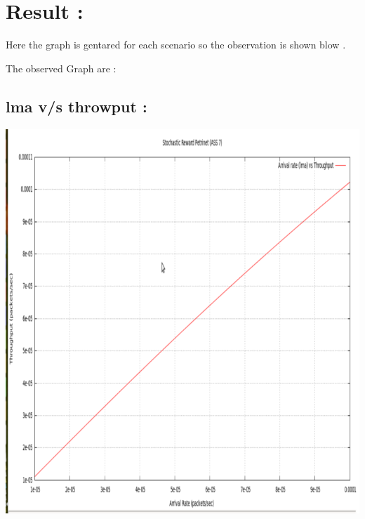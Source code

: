 \documentclass[a4paper,12pt]{article}
\begin{document}

\newpage

\section{Result :}
Here the graph is gentared for each scenario so the observation is shown blow .



The observed  Graph are :

\begin{center}
\subsection {lma v/s throwput :}
 \includegraphics[width=15 cm,height=13 cm]{G1.png}
\end{center}
\end{document}
